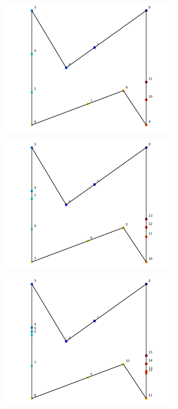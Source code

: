 \documentclass[]{article}  %
\begin{document}
\begin{figure}
\centering
\begin{subfigure}{0.6\textwidth}
  \includegraphics[width=\textwidth]{figures/iterbit1.png}
\end{subfigure}

\begin{subfigure}{0.6\textwidth}
  \includegraphics[width=\linewidth]{figures/iterbit2.png}
\end{subfigure}

\begin{subfigure}{0.6\textwidth}
  \includegraphics[width=\linewidth]{figures/iterbit3.png}
\end{subfigure}
\caption{}
\end{figure}
\end{document}
